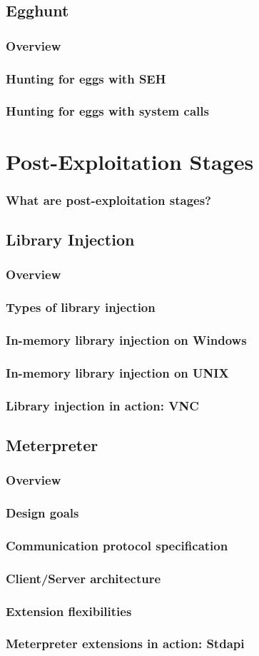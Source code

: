 \documentclass{beamer}
\begin{document}
    \subsection{Egghunt}
\begin{frame}[t]
    \frametitle{Overview}
\end{frame}
\begin{frame}[t]
    \frametitle{Hunting for eggs with SEH}
\end{frame}
\begin{frame}[t]
    \frametitle{Hunting for eggs with system calls}
\end{frame}

\section{Post-Exploitation Stages}
\begin{frame}[t]
    \frametitle{What are post-exploitation stages?}
\end{frame}

    \subsection{Library Injection}
\begin{frame}[t]
    \frametitle{Overview}
\end{frame}
\begin{frame}[t]
    \frametitle{Types of library injection}
\end{frame}
\begin{frame}[t]
    \frametitle{In-memory library injection on Windows}
\end{frame}
\begin{frame}[t]
    \frametitle{In-memory library injection on UNIX}
\end{frame}
\begin{frame}[t]
    \frametitle{Library injection in action: VNC}
\end{frame}
    \subsection{Meterpreter}
\begin{frame}[t]
    \frametitle{Overview}
\end{frame}
\begin{frame}[t]
    \frametitle{Design goals}
\end{frame}
\begin{frame}[t]
    \frametitle{Communication protocol specification}
\end{frame}
\begin{frame}[t]
    \frametitle{Client/Server architecture}
\end{frame}
\begin{frame}[t]
    \frametitle{Extension flexibilities}
\end{frame}
\begin{frame}[t]
    \frametitle{Meterpreter extensions in action: Stdapi}
\end{frame}
\end{document}
